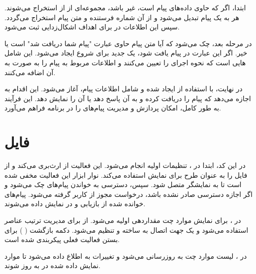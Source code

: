 \documentclass{report}
\begin{document}
ابتدا، اگر
  که حاوی داده‌های پیام است، غیر 
   باشد، مجموعه‌ای از
     از
      استخراج می‌شوند. هر
       به یک پیام 
       تبدیل می‌شود و از آن شماره فرستنده و متن پیام استخراج می‌گردد. سپس این اطلاعات در
        برای اهداف اشکال‌زدایی ثبت می‌شود.

در مرحله بعد، چک می‌شود که آیا متن پیام حاوی عبارت "پیام شما دریافت شد" است یا خیر. اگر این عبارت در پیام یافت شود، یک
 جدید برای شروع
  ایجاد می‌شود. این
   شامل
    هایی است که نحوه اجرای
     را تعیین می‌کنند و اطلاعات مربوط به پیام را به صورت
      به آن اضافه می‌کنند.

در نهایت،
 با استفاده از 
 ایجاد شده و شامل اطلاعات پیام، آغاز می‌شود. این اقدام به 
 اجازه می‌دهد که پیام را دریافت کرده و به آن پاسخ دهد یا آن را نمایش دهد. این فرآیند به طور کامل، امکان پردازش و مدیریت پیام‌های 
 را در برنامه فراهم می‌آورد.
 
 
 
\section{فایل
}
در این کد، ابتدا در 
، تنظیمات اولیه انجام می‌شود. این فعالیت از
 ارث‌بری می‌کند و از
   فایل
     را به عنوان طرح برای نمایش استفاده می‌کند. نوار ابزار این فعالیت مخفی شده است تا به نمایشگر متصل شود. سپس، دسترسی به خواندن پیام‌های
       چک می‌شود و اگر اجازه دسترسی صادر نشده باشد، درخواست مجوز از کاربر گرفته می‌شود. پیام‌های
         خوانده شده از
          بازیابی و در
           نمایش داده می‌شوند.

در
 ، 
  برای نمایش موارد چت مقداردهی اولیه می‌شود. از
    برای مدیریت ترتیب عناصر استفاده می‌شود و یک 
   جهت اتصال به 
    ساخته و تنظیم می‌شود. دکمه بازگشت (
    ) برای بستن فعالیت فعلی پیکربندی شده است.

در 
، لیست موارد چت به روزرسانی می‌شود و تغییرات به
 اطلاع داده می‌شود تا موارد نمایش داده شده در 
  به روز شوند.
\end{document}

